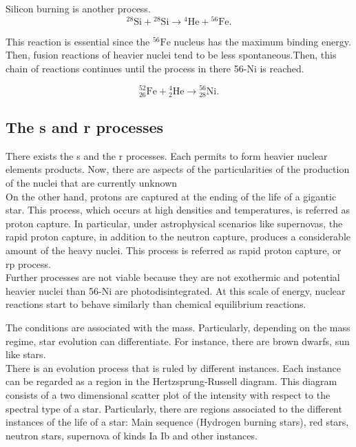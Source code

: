 \documentclass[openany]{book}
\begin{document}
Silicon burning is another process.\\

\begin{equation} \label{eq:reaction_28Sifusion_alpha56Fe}
	\mathrm{{}^{28}Si + {}^{28}Si \rightarrow {}^{4}He + {}^{56}Fe }.
\end{equation}

This reaction is essential since the $\mathrm{{}^{56}Fe}$ nucleus has the maximum binding energy. Then, fusion reactions of heavier nuclei tend to be less spontaneous.Then,  this chain of reactions continues until the process in there 56-Ni is reached.

\begin{equation}  \label{eq:reaction_52Fealpha}
	\mathrm{{}^{52}_{26}Fe +{}^{4}_{2}He \rightarrow {}^{56}_{28}Ni}.
\end{equation}


\subsection{The s and r processes} \label{sub:srProcesses}

There exists the s and  the r processes. Each permits to form heavier nuclear elements products. Now, there are aspects of the particularities of the production of the nuclei that  are currently  unknown \\

On the other hand, protons are captured at the ending of the life of a gigantic star. This process, which occurs at high densities and temperatures, is referred as proton capture. In particular, under astrophysical scenarios like supernovas, the rapid proton capture, in addition to the neutron capture,  produces a considerable amount of the heavy nuclei. This process is referred as rapid proton capture, or rp process. \\ 

Further processes are not viable because they are not exothermic and potential heavier nuclei than 56-Ni are photodisintegrated. At this scale of energy, nuclear reactions start to behave similarly than chemical equilibrium reactions. 

The conditions are associated with the mass. Particularly, depending on the mass regime, star evolution can differentiate. For instance, there are brown dwarfs, sun like stars. \\

There is an evolution process that is ruled by different instances. Each instance can be regarded as a region in the Hertzsprung-Russell diagram. This diagram consists of a two dimensional scatter plot of the intensity with respect to the spectral type of a star. Particularly, there are regions associated to the different instances of the life of a star: Main sequence (Hydrogen burning stars), red stars, neutron stars, supernova of kinds Ia Ib and other instances. \\
\end{document}
